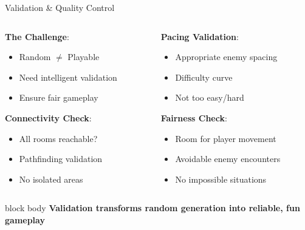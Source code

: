 \documentclass{beamer}
\begin{document}
\begin{frame}{Validation \& Quality Control}
    \begin{columns}[T]
        \begin{column}{0.48\textwidth}
            \textbf{The Challenge}:
            \begin{itemize}
                \item Random $\neq$ Playable
                \item Need intelligent validation
                \item Ensure fair gameplay
            \end{itemize}

            \vspace{0.3cm}
            \textbf{Connectivity Check}:
            \begin{itemize}
                \item All rooms reachable?
                \item Pathfinding validation
                \item No isolated areas
            \end{itemize}
        \end{column}

        \begin{column}{0.48\textwidth}
            \textbf{Pacing Validation}:
            \begin{itemize}
                \item Appropriate enemy spacing
                \item Difficulty curve
                \item Not too easy/hard
            \end{itemize}

            \vspace{0.3cm}
            \textbf{Fairness Check}:
            \begin{itemize}
                \item Room for player movement
                \item Avoidable enemy encounters
                \item No impossible situations
            \end{itemize}
        \end{column}
    \end{columns}

    \vspace{0.4cm}
    \begin{beamercolorbox}[rounded=true,shadow=true,wd=\textwidth,center]{block body}
        \textbf{Validation transforms random generation into reliable, fun gameplay}
    \end{beamercolorbox}
\end{frame}
\end{document}
